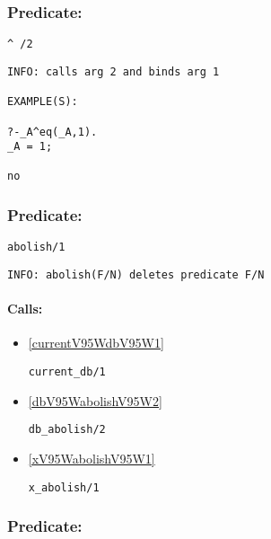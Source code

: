 \subsubsection{Predicate:} \label{V94WV95W2}

\begin{verbatim}
^ /2
\end{verbatim}

{\small \begin{verbatim}
INFO: calls arg 2 and binds arg 1

EXAMPLE(S):

?-_A^eq(_A,1).
_A = 1;

no

\end{verbatim}}

\subsubsection{Predicate:} \label{abolishV95W1}

\begin{verbatim}
abolish/1
\end{verbatim}

{\small \begin{verbatim}
INFO: abolish(F/N) deletes predicate F/N

\end{verbatim}}
\paragraph{Calls:} 
\begin{itemize}
\item \ref{currentV95WdbV95W1} 
\begin{verbatim}
current_db/1
\end{verbatim}

\item \ref{dbV95WabolishV95W2} 
\begin{verbatim}
db_abolish/2
\end{verbatim}

\item \ref{xV95WabolishV95W1} 
\begin{verbatim}
x_abolish/1
\end{verbatim}

\end{itemize}

\subsubsection{Predicate:} \label{abortV95W0}

